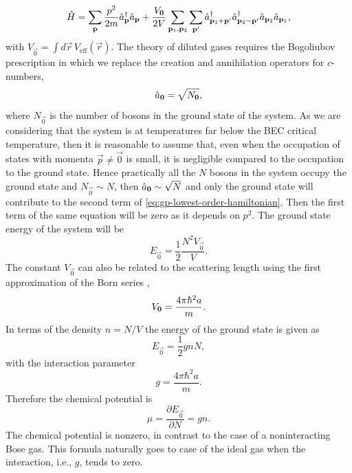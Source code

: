 %
\begin{equation}
  \label{eq:gp-lowest-order-hamiltonian}
  {\hat{H}} = \sum_{\mathbf p} \frac{p^2}{2m} {\hat{a}}^\dagger_{\mathbf p} {\hat{a}}_{\mathbf p} +
  \frac{V_{\mathbf 0}}{2 V} \sum_{\mathbf p_1, \mathbf p_2} \sum_{\mathbf p'} {\hat{a}}^\dagger_{\mathbf p_1 + \mathbf p'} {\hat{a}}^\dagger_{\mathbf p_2 - \mathbf p'} {\hat{a}}_{\mathbf p_2} {\hat{a}}_{\mathbf p_1},
\end{equation}
%
with $V_{\vec 0} = \int d \vec r \, V_\mathrm{eff}(\vec r)$. The theory of
diluted gases requires the Bogoliubov prescription in which we replace the
creation and annihilation operators for $c$-numbers,
%
\begin{equation}
  {\hat{a}}_\mathbf{0} = \sqrt{N_\mathbf{0}},
\end{equation}
%
where $N_\vec{0}$ is the number of bosons in the ground state of the system. As
we are considering that the system is at temperatures far below the BEC critical
temperature, then it is reasonable to assume that, even when the occupation of
states with momenta $\vec p \neq \vec 0$ is small, it is negligible compared to
the occupation to the ground state. Hence practically all the $N$ bosons in the
system occupy the ground state and $N_{\vec 0} \sim N$, then ${\hat{a}}_{\mathbf{0}}
  \sim \sqrt{N}$ and only the ground state will contribute to the second term of
\eqref{eq:gp-lowest-order-hamiltonian}. Then the first term of the same equation
will be zero as it depends on $p^2$. The ground state energy of the system will
be
%
\begin{equation}
  E_{\vec 0} = \frac{1}{2} \frac{N^2 V_{\vec 0}}{V}.
\end{equation}
%
The constant $V_{\vec 0}$ can also be related to the scattering length using the
first approximation of the Born series \cite{bib:pethick-smith-bec-2008},
%
\begin{equation}
  V_{\mathbf 0} = \frac{4 \pi \hbar^2 a}{m}.
\end{equation}
%
In terms of the density $n = N / V$ the energy of the ground state is given as
%
\begin{equation}
  \label{eq:gross-pitaevskii-ground-state-energy}
  E_{\vec 0} = \frac{1}{2} g n N,
\end{equation}
%
with the interaction parameter
%
\begin{equation}
  \label{eq:gross-pitaevskii-interaction-parameter}
  g = \frac{4 \pi \hbar^2 a }{m}.
\end{equation}
%
Therefore the chemical potential is
%
\begin{equation}
  \label{eq:gross-pitaevskii-chemical-potential}
  \mu = \frac{\partial E_{\vec 0}}{\partial N} = g n.
\end{equation}
%
The chemical potential is nonzero, in contrast to the case of a noninteracting
Bose gas. This formula naturally goes to case of the ideal gas when the
interaction, i.e., $g$, tends to zero.


